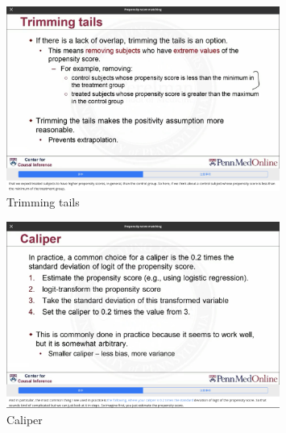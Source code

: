 \begin{figure}[htbp]
	\setlength{\abovecaptionskip}{0pt}     %
	\setlength{\belowcaptionskip}{10pt}
	\vspace{-0cm}  %
	\setlength{\abovecaptionskip}{-0cm}   %
	\setlength{\belowcaptionskip}{-0cm}   %
	\centering
	\includegraphics[width=0.8\textwidth]{figure/trim.jpg}
	\caption{Trimming tails}
	\label{trim}
\end{figure}

\begin{figure}[htbp]
	\setlength{\abovecaptionskip}{0pt}     %
	\setlength{\belowcaptionskip}{10pt}
	\vspace{-0cm}  %
	\setlength{\abovecaptionskip}{-0cm}   %
	\setlength{\belowcaptionskip}{-0cm}   %
	\centering
	\includegraphics[width=0.8\textwidth]{figure/caliper.jpg}
	\caption{Caliper}
	\label{caliper}
\end{figure}



